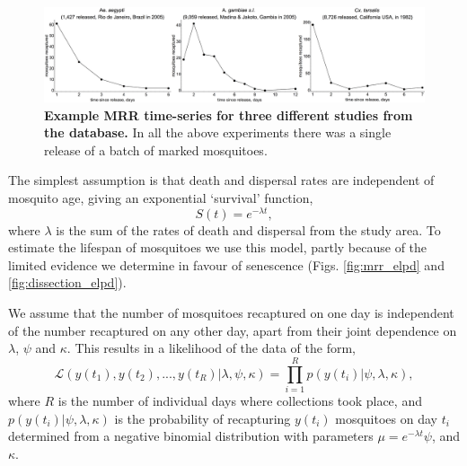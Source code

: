 \documentclass[12pt]{article}
\begin{document}
\begin{figure}[h]
	\centerline{\includegraphics[width=1.25\textwidth]{./Figure_files/mrr_exampleMRRSeries.pdf}}
	\caption{\textbf{Example MRR time-series for three different studies from the \cite{guerra2014global} database.} In all the above experiments there was a single release of a batch of marked mosquitoes.}
	\label{fig:mrr_exampleMRRSeries}
\end{figure}

The simplest assumption is that death and dispersal rates are independent of mosquito age, giving an exponential `survival' function,
%
\begin{equation}
S(t) = e^{-\lambda t},
\end{equation}
%
where $\lambda$ is the sum of the rates of death and dispersal from the study area. To estimate the lifespan of mosquitoes we use this model, partly because of the limited evidence we determine in favour of senescence (Figs. \ref{fig:mrr_elpd} and \ref{fig:dissection_elpd}).

We assume that the number of mosquitoes recaptured on one day is independent of the number recaptured on any other day, apart from their joint dependence on $\lambda$, $\psi$ and $\kappa$. This results in a likelihood of the data of the form,
%
\begin{equation}
\mathcal{L}(y(t_1),y(t_2),...,y(t_R)|\lambda,\psi,\kappa) = \prod\limits_{i=1}^{R} p(y(t_i)|\psi,\lambda,\kappa),
\end{equation}
%
where $R$ is the number of individual days where collections took place, and $p(y(t_i)|\psi,\lambda,\kappa)$ is the probability of recapturing $y(t_i)$ mosquitoes on day $t_i$ determined from a negative binomial distribution with parameters $\mu = e^{-\lambda t} \psi$, and $\kappa$.
\end{document}
